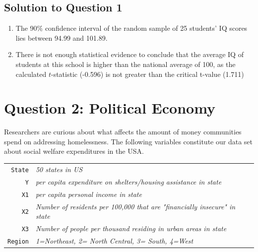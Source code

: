 \documentclass[12pt,letterpaper]{article}
\begin{document}
\newpage
\subsection*{Solution to Question 1}

\begin{enumerate}
	\item The 90\% confidence interval of the random sample of 25 students’ IQ scores lies between 94.99 and 101.89.\\
	
		
	\item There is not enough statistical evidence to conclude that the average IQ of students at this school is higher than the national average of 100, as the calculated $t$-statistic (-0.596) is not greater than the critical t-value (1.711)\\
	
		
\end{enumerate}
\newpage

\section*{Question 2: Political Economy}

\noindent Researchers are curious about what affects the amount of money communities spend on addressing homelessness. The following variables constitute our data set about social welfare expenditures in the USA. \\
\vspace{.5cm}


\begin{tabular}{r|l}
	\texttt{State} &\emph{50 states in US} \\
	\texttt{Y} & \emph{per capita expenditure on shelters/housing assistance in state}\\
	\texttt{X1} &\emph{per capita personal income in state} \\
	\texttt{X2} &  \emph{Number of residents per 100,000 that are "financially insecure" in state}\\
	\texttt{X3} &  \emph{Number of people per thousand residing in urban areas in state} \\
	\texttt{Region} &  \emph{1=Northeast, 2= North Central, 3= South, 4=West} \\
\end{tabular}
\end{document}
